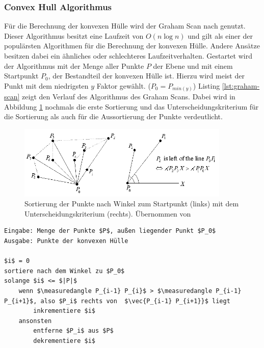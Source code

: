 \subsubsection{Convex Hull Algorithmus}

Für die Berechnung der konvexen Hülle wird der Graham Scan nach \citet{graham1972efficient} genutzt. Dieser Algorithmus besitzt eine Laufzeit von \(O(n \log n)\) und gilt als einer der populärsten Algorithmen für die Berechnung der konvexen Hülle. Andere Ansätze besitzen dabei ein ähnliches oder schlechteres Laufzeitverhalten. Gestartet wird der Algorithmus mit der Menge aller Punkte \(P\) der Ebene und mit einem Startpunkt \(P_0\), der Bestandteil der konvexen Hülle ist. Hierzu wird meist der Punkt mit dem niedrigsten \(y\) Faktor gewählt. (\(P_0=P_{min(y)}\)) Listing \ref{lst:graham-scan} zeigt den Verlauf des Algorithmus des Graham Scans. Dabei wird in Abbildung \ref{fig:convexhull} nochmals die erste Sortierung und das Unterscheidungskriterium für die Sortierung als auch für die Aussortierung der Punkte verdeutlicht. \citep{convexHull} \\

\begin{figure}
  \centering
	\includegraphics[width=0.9\textwidth]{content/images/methods/convexhull.png} 
  \caption{Sortierung der Punkte nach Winkel zum Startpunkt (links) mit dem Unterscheidungskriterium (rechts). Übernommen von \citet{convexHull}}
  \label{fig:convexhull}
\end{figure}

\begin{lstlisting}[mathescape,caption=Graham Scan Algorithmus, label=lst:graham-scan]
Eingabe: Menge der Punkte $P$, außen liegender Punkt $P_0$
Ausgabe: Punkte der konvexen Hülle

$i$ = 0
sortiere nach dem Winkel zu $P_0$
solange $i$ <= $|P|$
    wenn $\measuredangle P_{i-1} P_{i}$ > $\measuredangle P_{i-1} P_{i+1}$, also $P_i$ rechts von  $\vec{P_{i-1} P_{i+1}}$ liegt
        inkrementiere $i$
    ansonsten
        entferne $P_i$ aus $P$
        dekrementiere $i$
    
\end{lstlisting} 


